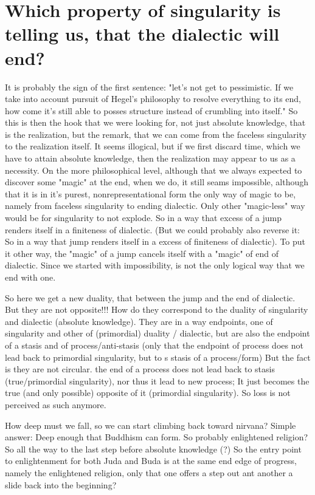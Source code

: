 \documentclass[10pt]{book}
\begin{document}
\section{Which property of singularity is telling us, that the dialectic will end?}

It is probably the sign of the first sentence: "let's not get to pessimistic. If we take into account pursuit of Hegel's philosophy to resolve everything to its end, how come it's still able to posses structure instead of crumbling into itself." So this is then the hook that we were looking for, not just absolute knowledge, that is the realization, but the remark, that we can come from the faceless singularity to the realization itself. It seems illogical, but if we first discard time, which we have to attain absolute knowledge, then the realization may appear to us as a necessity. On the more philosophical level, although that we always expected to discover some "magic" at the end, when we do, it still seams impossible, although that it is in it's purest, nonrepresentational form the only way of magic to be, namely from faceless singularity to ending dialectic. Only other "magic-less" way would be for singularity to not explode. So in a way that excess of a jump renders itself in a finiteness of dialectic. (But we could probably also reverse it: So in a way that jump renders itself in a excess of finiteness of dialectic). To put it other way, the "magic" of a jump cancels itself with a "magic" of end of dialectic. Since we started with impossibility, is not the only logical way that we end with one. 

So here we get a new duality, that between the jump and the end of dialectic. But they are not opposite!!! How do they correspond to the duality of singularity and dialectic (absolute knowledge). They are in a way endpoints, one of singularity and other of (primordial) duality / dialectic, but are also the endpoint of a stasis and of process/anti-stasis (only that the endpoint of process does not lead back to primordial singularity, but to s stasis of a process/form) But the fact is they are not circular. the end of a process does not lead back to stasis (true/primordial singularity), nor thus it lead to new process; It just becomes the true (and only possible) opposite of it (primordial singularity). So loss is not perceived as such anymore. 

How deep must we fall, so we can start climbing back toward nirvana?
Simple answer: Deep enough that Buddhism can form. So probably enlightened religion? So all the way to the last step before absolute knowledge (?) So the entry point to enlightenment for both Juda and Buda is at the same end edge of progress, namely the enlightened religion, only that one offers a step out ant another a slide back into the beginning?
\end{document}
